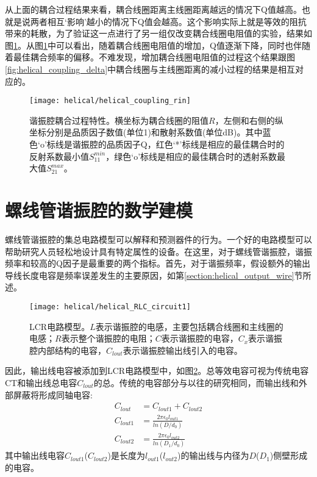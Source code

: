 从上面的耦合过程结果来看，耦合线圈距离主线圈距离越远的情况下Q值越高。也就是说两者相互‘影响’越小的情况下Q值会越高。这个影响实际上就是等效的阻抗带来的耗散，为了验证这一点进行了另一组仅改变耦合线圈电阻值的实验，结果如图\ref{fig:helical_coupling_rin}。从图\ref{fig:helical_coupling_rin}中可以看出，随着耦合线圈电阻值的增加，Q值逐渐下降，同时也伴随着最佳耦合频率的偏移。不难发现，增加耦合线圈电阻值的过程这个结果跟图\ref{fig:helical_coupling_delta}中耦合线圈与主线圈距离的减小过程的结果是相互对应的。
\begin{figure}
    \centering
    \texttt{[image: helical/helical\_coupling\_rin]}
    \caption[谐振腔耦合过程特性]{谐振腔耦合过程特性。横坐标为耦合线圈的阻值$R$，左侧和右侧的纵坐标分别是品质因子数值(单位1)和散射系数值(单位dB)。其中蓝色‘o’标线是谐振腔的品质因子Q，红色‘*’标线是相应的最佳耦合时的反射系数最小值$S_{11}^{min}$，绿色‘o’标线是相应的最佳耦合时的透射系数最大值$S_{21}^{max}$。\label{fig:helical_coupling_rin}}
\end{figure}



\newpage
\section[螺线管谐振腔的数学建模]{螺线管谐振腔的数学建模\label{section:helical_theory_model}}

螺线管谐振腔的集总电路模型可以解释和预测器件的行为。一个好的电路模型可以帮助研究人员轻松地设计具有特定属性的设备。在这里，对于螺线管谐振腔，谐振频率和较高的Q因子是最重要的两个指标。首先，对于谐振频率，假设额外的输出导线长度电容是频率误差发生的主要原因，如第\ref{section:helical_output_wire}节所述。

\begin{figure}
    \centering
    \texttt{[image: helical/helical\_RLC\_circuit1]}
    \caption[LCR电路模型]{LCR电路模型。$L$表示谐振腔的电感，主要包括耦合线圈和主线圈的电感；$R$表示整个谐振腔的电阻；$C$表示谐振腔的电容，$C_x$表示谐振腔内部结构的电容，$C_{lout}$表示谐振腔输出线引入的电容。\label{fig:helical_RLC_circuit1}}
\end{figure}

因此，输出线电容被添加到LCR电路模型中，如图\ref{fig:helical_RLC_circuit1}。总等效电容可视为传统电容CT和输出线总电容$C_{lout}$的总。传统的电容部分与以往的研究相同，而输出线和外部屏蔽将形成同轴电容:
\begin{align} 
	C_{lout}&=C_{lout1}+C_{lout2} \label{eq:helical_lout}\\ 
	C_{lout1}&=\frac{2\pi\epsilon_0 l_{out1}}{ln(D/d_0)} \label{eq:helical_lout1}\\ 
	C_{lout2}&=\frac{2\pi\epsilon_0 l_{out2}}{ln(D_1/d_0)} \label{eq:helical_lout2}
\end{align}
其中输出线电容$C_{lout1}$($C_{lout2}$)是长度为$l_{out1}$($l_{out2}$)的输出线与内径为$D$($D_1$)侧壁形成的电容。

